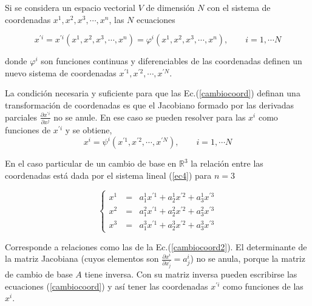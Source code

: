 Si se considera un espacio vectorial $V$ de dimensión $N$ con el sistema de coordenadas $  x^1, x^{2}, x^{3},\cdots,x^{n}$, las $N$ ecuaciones 




\begin{equation}
x^{\prime i} = x^{\prime i}( x^1, x^{2}, x^{3},\cdots,x^{n} )= \varphi ^i( x^1, x^{2}, x^{3},\cdots,x^{n} ), \qquad i=1, \cdots N
\label{cambiocoord}
\end{equation}

\bigskip
\noindent
donde $  \varphi ^i$  son funciones continuas y diferenciables de las coordenadas  definen un nuevo sistema de coordenadas  $  x^{\prime 1}, x^{\prime 2}, \cdots, x^{\prime N}$.

\bigskip

La condición necesaria y suficiente para que las Ec.(\ref{cambiocoord}) definan una transformación de coordenadas 
es que el Jacobiano formado por las derivadas parciales $  \frac{\partial  x^{\prime i}}{\partial   x^{j}}$ no se anule.
En ese caso se pueden resolver para las $  x^i$  como funciones de $  x^{\prime i}$ y se obtiene, 
\begin{equation}
x^{i} = \psi ^i( x^{\prime 1}, x^{\prime 2}, \cdots, x^{\prime N} ), \qquad i=1, \cdots N
\label{cambiocoord2}
\end{equation}


\bigskip

\begin{example}
\label{ejrelcont2}
 En el caso particular de un cambio de base en $\mathbb{R}^3$   la relación entre las coordenadas está dada por el sistema lineal (\ref{ec4}) para $n=3$


\begin{equation}
\left\{ \begin{array} {ccl} 
                    x^1&\ =&   a^1_{1}x^{\prime 1}+a^1_{2}x^{\prime 2}+a^1_{3}x^{\prime 3}    \\
                     x^2 &\ = &a^2_{1}x^{\prime 1}+a^2_{2}x^{\prime 2}+a^2_{3}x^{\prime 3} \\
                    x^3 &\ =&a^3_{1}x^{\prime 1}+a^3_{2}x^{\prime 2}+a^3_{3}x^{\prime 3}
                   \end{array}
           \right.
\end{equation}

Corresponde a  relaciones como  las de la Ec.(\ref{cambiocoord2}). El determinante de la matriz Jacobiana (cuyos elementos son $  \frac{\partial  x^{i}}{\partial   x^{\prime}_j}= a^i_{j}$) no se anula, porque   la matriz de cambio de base $A$ tiene inversa. Con su matriz inversa  pueden escribirse  las ecuaciones    (\ref{cambiocoord}) y así tener   las coordenadas $x^{\prime i}$ como funciones de las  $x^i$.
\end{example}
